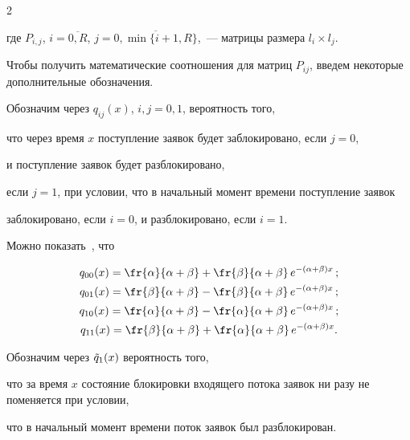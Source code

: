\begin{multicols}{2}





\noindent


где $P_{i,j}$, $i=\overline{0,R}$, $j=\overline{0,\min\{i+1,R\}}$,~--- матрицы размера $l_i\times l_j$.





Чтобы получить математические соотношения для матриц $P_{ij}$, введем некоторые дополнительные обозначения.





Обозначим через $q_{ij}(x)$,  $i, j=0,1$, вероятность того,


что через время $x$ поступление заявок будет заблокировано, если $j=0$,


и поступление заявок будет разблокировано,


если $j=1$, при условии, что в начальный момент времени поступление заявок


заблокировано, если $i=0$, и разблокировано, если $i=1$.





Можно показать~\cite{C08}, что


\begin{gather*}


q_{00}(x)=\fr{\alpha}{\alpha+\beta}+\fr{\beta}{\alpha+\beta}\,


e^{-(\alpha+\beta)x}\,;\\


q_{01}(x)=\fr{\beta}{\alpha+\beta}-\fr{\beta}{\alpha+\beta}\,e^{-(\alpha+\beta)x}\,;\\


q_{10}(x)=\fr{\alpha}{\alpha+\beta}-\fr{\alpha}{\alpha+\beta}\,e^{-(\alpha+\beta)x}\,;\\


q_{11}(x)=\fr{\beta}{\alpha+\beta}+\fr{\alpha}{\alpha+\beta}\,e^{-(\alpha+\beta)x}.


\end{gather*}





Обозначим через $\Tilde q_1(x)$ вероятность того,


что за время $x$ состояние блокировки входящего потока заявок ни разу не поменяется при условии,


что в начальный момент времени поток заявок был разблокирован.



\end{multicols}
